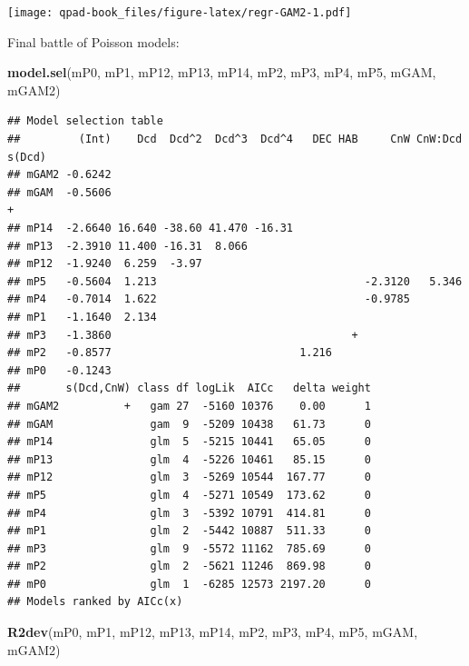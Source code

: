 \documentclass[12pt,]{book}
\newenvironment{Shaded}{\begin{snugshade}}{\end{snugshade}}
\newcommand{\KeywordTok}[1]{\textcolor[rgb]{0.13,0.29,0.53}{\textbf{#1}}}
\newcommand{\NormalTok}[1]{#1}
\begin{document}
\texttt{[image: qpad-book\_files/figure-latex/regr-GAM2-1.pdf]}

Final battle of Poisson models:

\begin{Shaded}
\begin{Highlighting}[]
\KeywordTok{model.sel}\NormalTok{(mP0, mP1, mP12, mP13, mP14, mP2, mP3, mP4, mP5, mGAM, mGAM2)}
\end{Highlighting}
\end{Shaded}

\begin{verbatim}
## Model selection table 
##         (Int)    Dcd  Dcd^2  Dcd^3  Dcd^4   DEC HAB     CnW CnW:Dcd s(Dcd)
## mGAM2 -0.6242                                                             
## mGAM  -0.5606                                                            +
## mP14  -2.6640 16.640 -38.60 41.470 -16.31                                 
## mP13  -2.3910 11.400 -16.31  8.066                                        
## mP12  -1.9240  6.259  -3.97                                               
## mP5   -0.5604  1.213                                -2.3120   5.346       
## mP4   -0.7014  1.622                                -0.9785               
## mP1   -1.1640  2.134                                                      
## mP3   -1.3860                                     +                       
## mP2   -0.8577                             1.216                           
## mP0   -0.1243                                                             
##       s(Dcd,CnW) class df logLik  AICc   delta weight
## mGAM2          +   gam 27  -5160 10376    0.00      1
## mGAM               gam  9  -5209 10438   61.73      0
## mP14               glm  5  -5215 10441   65.05      0
## mP13               glm  4  -5226 10461   85.15      0
## mP12               glm  3  -5269 10544  167.77      0
## mP5                glm  4  -5271 10549  173.62      0
## mP4                glm  3  -5392 10791  414.81      0
## mP1                glm  2  -5442 10887  511.33      0
## mP3                glm  9  -5572 11162  785.69      0
## mP2                glm  2  -5621 11246  869.98      0
## mP0                glm  1  -6285 12573 2197.20      0
## Models ranked by AICc(x)
\end{verbatim}

\begin{Shaded}
\begin{Highlighting}[]
\KeywordTok{R2dev}\NormalTok{(mP0, mP1, mP12, mP13, mP14, mP2, mP3, mP4, mP5, mGAM, mGAM2)}
\end{Highlighting}
\end{Shaded}
\end{document}
